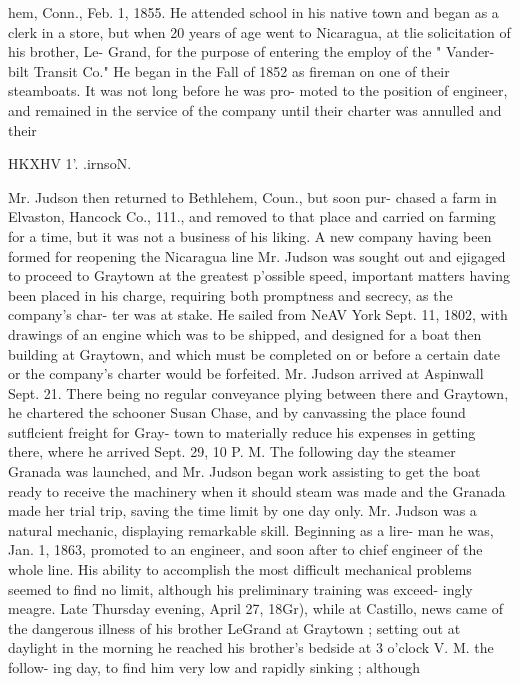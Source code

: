\documentclass[oneside]{book}
\begin{document}
hem, Conn., Feb. 1, 1855. He attended school in his native 
town and began as a clerk in a store, but when 20 years of 
age went to Nicaragua, at tlie solicitation of his brother, Le- 
Grand, for the purpose of entering the employ of the " Vander- 
bilt Transit Co." He began in the Fall of 1852 as fireman on 
one of their steamboats. It was not long before he was pro- 
moted to the position of engineer, and remained in the service 
of the company until their charter was annulled and their 




HKXHV 1'. .irnsoN. 




Mr. Judson then returned to Bethlehem, Coun., but soon pur- 
chased a farm in Elvaston, Hancock Co., 111., and removed to 
that place and carried on farming for a time, but it was not a 
business of his liking. A new company having been formed 
for reopening the Nicaragua line Mr. Judson was sought out 
and ejigaged to proceed to Graytown at the greatest p'ossible 
speed, important matters having been placed in his charge, 
requiring both promptness and secrecy, as the company's char- 
ter was at stake. He sailed from NeAV York Sept. 11, 1802, 
with drawings of an engine which was to be shipped, and 
designed for a boat then building at Graytown, and which must 
be completed on or before a certain date or the company's 
charter would be forfeited. Mr. Judson arrived at Aspinwall 
Sept. 21. There being no regular conveyance plying between 
there and Graytown, he chartered the schooner Susan Chase, 
and by canvassing the place found sutflcient freight for Gray- 
town to materially reduce his expenses in getting there, where 
he arrived Sept. 29, 10 P. M. The following day the steamer 
Granada was launched, and Mr. Judson began work assisting 
to get the boat ready to receive the machinery when it should 
steam was made and the Granada made her trial trip, saving 
the time limit by one day only. Mr. Judson was a natural 
mechanic, displaying remarkable skill. Beginning as a lire- 
man he was, Jan. 1, 1863, promoted to an engineer, and soon 
after to chief engineer of the whole line. His ability to 
accomplish the most difficult mechanical problems seemed to 
find no limit, although his preliminary training was exceed- 
ingly meagre. Late Thursday evening, April 27, 18Gr), while 
at Castillo, news came of the dangerous illness of his brother 
LeGrand at Graytown ; setting out at daylight in the morning 
he reached his brother's bedside at 3 o'clock V. M. the follow- 
ing day, to find him very low and rapidly sinking ; although 
\end{document}
